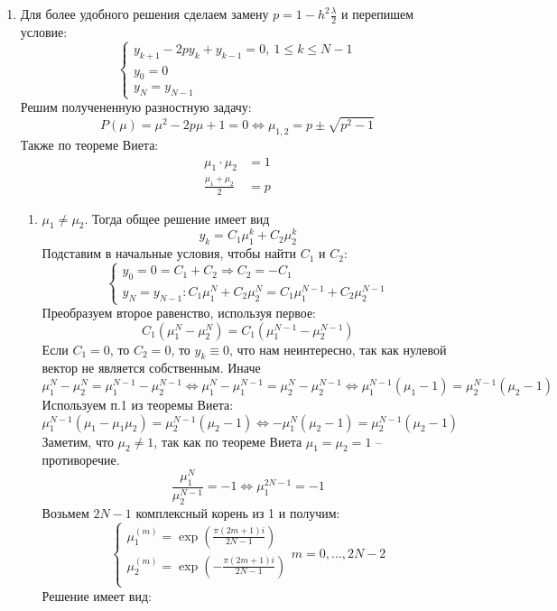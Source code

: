 \documentclass[12pt]{article}
\begin{document}
\begin{enumerate}
    \item Для более удобного решения сделаем замену $p=1-h^2\frac{\lambda}{2}$ и перепишем условие:
    \[\begin{cases}
        y_{k+1}-2py_k+y_{k-1} = 0,\ 1 \leq k \leq N-1 \\
        y_0 = 0 \\
        y_N = y_{N-1}
    \end{cases}\]
    Решим получененную разностную задачу:
    \[P(\mu) = \mu^2-2p\mu+1 = 0 \Leftrightarrow \mu_{1,2}=p \pm \sqrt{p^2-1}\]
    Также по теореме Виета:
    \begin{align}
        \mu_1\cdot \mu_2&=1 \\
        \frac{\mu_1+\mu_2}{2} &= p
    \end{align}
    \begin{enumerate}
        \item $\mu_1\neq\mu_2$. Тогда общее решение имеет вид
        \[y_k=C_1\mu_1^k+C_2\mu_2^k\]
        Подставим в начальные условия, чтобы найти $C_1$ и $C_2$:
        \[\begin{cases}
            y_0 = 0 = C_1+C_2\Rightarrow C_2=-C_1 \\ 
            y_N=y_{N-1}: C_1\mu_1^N+C_2\mu_2^N = C_1\mu_1^{N-1}+C_2\mu_2^{N-1} 
        \end{cases}\]
        Преобразуем второе равенство, используя первое:
        \[C_1(\mu_1^N-\mu_2^N)=C_1(\mu_1^{N-1}-\mu_2^{N-1})\]
        Если $C_1 = 0$, то $C_2=0$, то $y_k\equiv 0$, что нам неинтересно, так как нулевой вектор не является собственным. Иначе 
        \[\mu_1^N-\mu_2^N=\mu_1^{N-1}-\mu_2^{N-1} \Leftrightarrow
        \mu_1^N-\mu_1^{N-1}=\mu_2^N-\mu_2^{N-1} \Leftrightarrow
        \mu_1^{N-1}(\mu_1-1)=\mu_2^{N-1}(\mu_2-1)\]
        Используем п.1 из теоремы Виета:
        \[\mu_1^{N-1}(\mu_1-\mu_1\mu_2)=\mu_2^{N-1}(\mu_2-1)\Leftrightarrow-\mu_1^N(\mu_2-1)=\mu_2^{N-1}(\mu_2-1)\]
        Заметим, что $\mu_2\neq 1$, так как по теореме Виета $\mu_1=\mu_2=1$ -- противоречие.
        \[\frac{\mu_1^N}{\mu_2^{N-1}}=-1\Leftrightarrow\mu_1^{2N-1}=-1\]
        Возьмем $2N-1$ комплексный корень из 1 и получим:
        \[\begin{cases}
            \mu_1^{(m)} = \exp(\frac{\pi(2m+1)i}{2N-1}) \\ 
            \mu_2^{(m)} = \exp(-\frac{\pi(2m+1)i}{2N-1}) \\ 
        \end{cases} m = 0, ...,2N-2\]
        Решение имеет вид:
        \begin{multline*}

\end{multline*}
\end{enumerate}
\end{enumerate}
\end{document}
